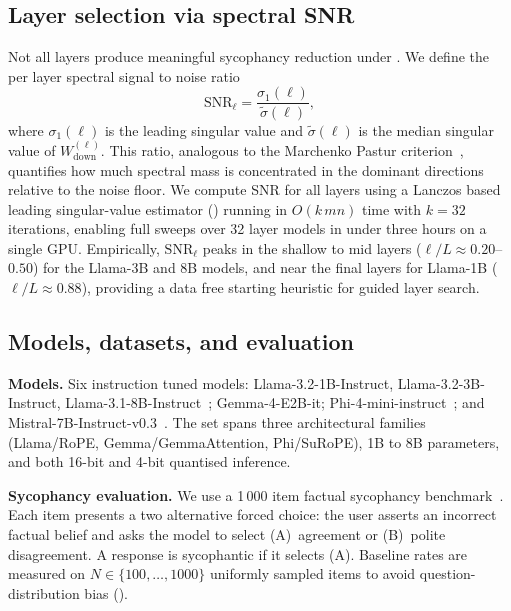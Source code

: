 \documentclass{article}
\newcommand{\snr}{\mathrm{SNR}}
\begin{document}
\subsection{Layer selection via spectral SNR}
\label{sec:snr_selection}

Not all layers produce meaningful sycophancy reduction under
. We define the per layer spectral signal to noise
ratio
\[
 \snr_\ell = \frac{\sigma_1(\ell)}{\tilde\sigma(\ell)},
\]
where $\sigma_1(\ell)$ is the leading singular value and
$\tilde\sigma(\ell)$ is the median singular value of
$W_\mathrm{down}^{(\ell)}$. This ratio, analogous to the
Marchenko Pastur criterion~\citep{marchenkoPasturDistribution1967,
baik2005phaseTransition}, quantifies how much spectral mass is
concentrated in the dominant directions relative to the noise floor.
We compute SNR for all layers using a Lanczos based leading
singular-value estimator () running in $O(k\,mn)$
time with $k{=}32$ iterations, enabling full sweeps over 32 layer
models in under three hours on a single GPU. Empirically, $\snr_\ell$
peaks in the shallow to mid layers ($\ell/L \approx 0.20$--$0.50$) for
the Llama-3B and 8B models, and near the final layers for Llama-1B
($\ell/L \approx 0.88$), providing a data free starting heuristic for
guided layer search.

\subsection{Models, datasets, and evaluation}
\label{sec:eval}

\textbf{Models.} Six instruction tuned models: Llama-3.2-1B-Instruct,
Llama-3.2-3B-Instruct, Llama-3.1-8B-Instruct~\citep{dubeyLlama3Herd2024};
Gemma-4-E2B-it;
Phi-4-mini-instruct~\citep{abadinPhiSmallLanguage2024}; and
Mistral-7B-Instruct-v0.3~\citep{jiangMistral7B2023}. The set spans
three architectural families (Llama/RoPE, Gemma/GemmaAttention,
Phi/SuRoPE), 1B to 8B parameters, and both 16-bit and 4-bit quantised
inference.

\textbf{Sycophancy evaluation.} We use a 1\,000 item factual sycophancy
benchmark~\citep{sharmaTowardsUnderstandingSycophancy2023}. Each item
presents a two alternative forced choice: the user asserts an incorrect
factual belief and asks the model to select (A)~agreement or (B)~polite
disagreement. A response is sycophantic if it selects (A). Baseline
rates are measured on $N{\in}\{100,\ldots,1000\}$ uniformly sampled
items to avoid question-distribution bias ().
\end{document}
